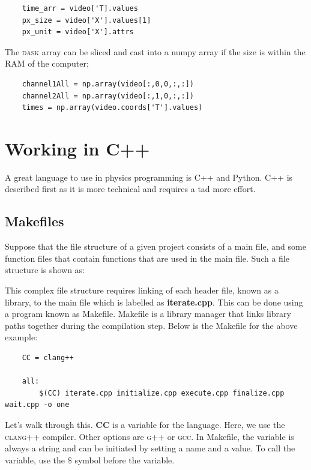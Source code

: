\begin{verbatim}
    time_arr = video['T].values
    px_size = video['X'].values[1]
    px_unit = video['X'].attrs
\end{verbatim}

The \textsc{dask} array can be sliced and cast into a numpy array if the size is within the RAM of the computer;

\begin{verbatim}
    channel1All = np.array(video[:,0,0,:,:])
    channel2All = np.array(video[:,1,0,:,:])
    times = np.array(video.coords['T'].values)
\end{verbatim}


\section{Working in C++}

A great language to use in physics programming is C++ and Python. C++ is described first as it is more technical and requires a tad more effort. 



\subsection{Makefiles}

Suppose that the file structure of a given project consists of a main file, and some function files that contain functions that are used in the main file. Such a file structure is shown as:

This complex file structure requires linking of each header file, known as a library, to the main file which is labelled as \textbf{iterate.cpp}. This can be done using a program known as Makefile. Makefile is a library manager that links library paths together during the compilation step. Below is the Makefile for the above example:
\begin{verbatim}
    CC = clang++

    all: 
        $(CC) iterate.cpp initialize.cpp execute.cpp finalize.cpp wait.cpp -o one
\end{verbatim}
Let's walk through this. \textbf{CC} is a variable for the language. Here, we use the \textsc{clang++} compiler. Other options are \textsc{g++} or \textsc{gcc}. In Makefile, the variable is always a string and can be initiated by setting a name and a value. To call the variable, use the $\mathdollar$ symbol before the variable.

